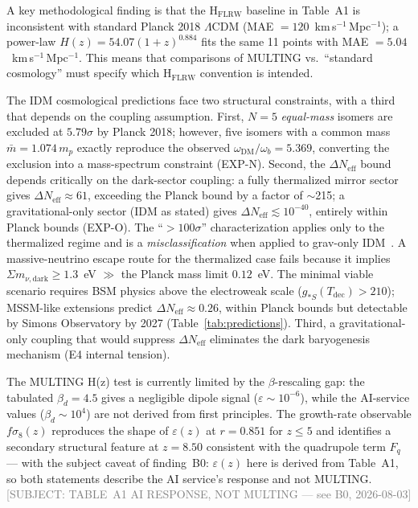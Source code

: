 \documentclass[twocolumn,prd,amsmath,amssymb,floatfix]{revtex4-2}
\newcommand{\tableAsubject}{\textcolor{gray}{\small[SUBJECT:
  TABLE~A1 AI RESPONSE, NOT MULTING --- see B0, 2026-08-03]}}
\begin{document}
A key methodological finding is that the H$_\mathrm{FLRW}$ baseline in
Table~A1 is inconsistent with standard Planck 2018 $\Lambda$CDM
(MAE $= 120$~km\,s$^{-1}$\,Mpc$^{-1}$); a power-law $H(z)=54.07(1+z)^{0.884}$
fits the same 11 points with MAE $= 5.04$~km\,s$^{-1}$\,Mpc$^{-1}$.
This means that comparisons of MULTING vs.\ ``standard cosmology'' must
specify which H$_\mathrm{FLRW}$ convention is intended.

The IDM cosmological predictions face two structural constraints, with a
third that depends on the coupling assumption.
First, $N=5$ \emph{equal-mass} isomers are excluded at $5.79\sigma$ by Planck
2018; however, five isomers with a common mass $\bar{m} = 1.074\,m_p$ exactly
reproduce the observed $\omega_\mathrm{DM}/\omega_b = 5.369$, converting the
exclusion into a mass-spectrum constraint (EXP-N).
Second, the $\Delta N_\mathrm{eff}$ bound depends critically on the dark-sector
coupling: a fully thermalized mirror sector gives $\Delta N_\mathrm{eff} \approx 61$,
exceeding the Planck bound by a factor of $\sim$215; a gravitational-only sector (IDM as stated) gives
$\Delta N_\mathrm{eff} \lesssim 10^{-40}$, entirely within Planck bounds (EXP-O).
The ``$>100\sigma$'' characterization applies only to the thermalized regime
and is a \emph{misclassification} when applied to grav-only IDM~\cite{clery2021}.
A massive-neutrino escape route for the thermalized case fails because it implies
$\Sigma m_{\nu,\mathrm{dark}} \geq 1.3$~eV $\gg$ the Planck mass limit
$0.12$~eV.
The minimal viable scenario requires BSM physics above the electroweak scale
($g_{*S}(T_\mathrm{dec}) > 210$); MSSM-like extensions predict
$\Delta N_\mathrm{eff} \approx 0.26$, within Planck bounds but detectable by
Simons Observatory by 2027 (Table~\ref{tab:predictions}).
Third, a gravitational-only coupling that would suppress $\Delta N_\mathrm{eff}$
eliminates the dark baryogenesis mechanism (E4 internal tension).

The MULTING H(z) test is currently limited by the $\beta$-rescaling gap:
the tabulated $\beta_d = 4.5$ gives a negligible dipole signal
($\varepsilon \sim 10^{-6}$), while the AI-service values
($\beta_d \sim 10^4$) are not derived from first principles.
The growth-rate observable $f\sigma_8(z)$ reproduces the shape of
$\varepsilon(z)$ at $r = 0.851$ for $z \le 5$ and identifies a secondary
structural feature at $z = 8.50$ consistent with the quadrupole term $F_q$
--- with the subject caveat of finding~B0: $\varepsilon(z)$ here is derived
from Table~A1, so both statements describe the AI service's response and
not MULTING.
\tableAsubject
\end{document}
